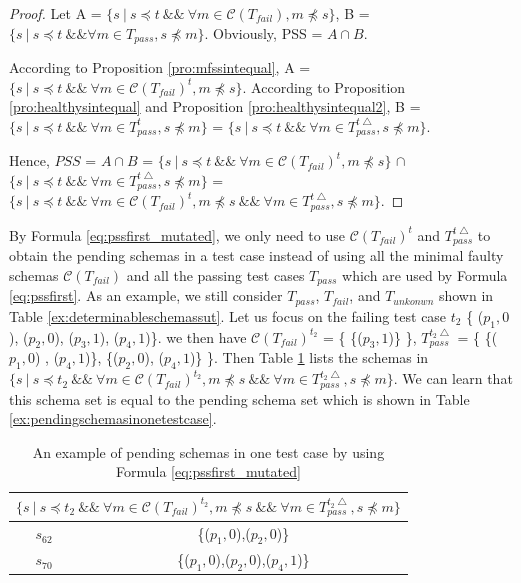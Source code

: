 \begin{proof}

Let A = $\{ s\ |\  s \preceq t\ \&\&\ \forall m \in \mathcal{C}(T_{fail}),  m \npreceq s \}$, B = $ \{ s\ |\ s \preceq t\ \&\&  \forall m \in T_{pass}, s \npreceq m \} $. Obviously, PSS = $A \cap B$.

According to Proposition \ref{pro:mfssintequal}, A = $\{ s\ |\  s \preceq t\ \&\&\ \forall m \in \mathcal{C}(T_{fail})^{t},  m \npreceq s \}$.
According to Proposition \ref{pro:healthysintequal} and Proposition \ref{pro:healthysintequal2}, B = $\{ s\ |\  s \preceq t\ \&\&\ \forall m \in T_{pass}^{t},  s \npreceq m \}$ = $\{ s\ |\  s \preceq t\ \&\&\ \forall m \in T_{pass}^{t\bigtriangleup},  s \npreceq m \}$.

Hence, $PSS$ = $A \cap B$ = $\{ s\ |\  s \preceq t\ \&\&\ \forall m \in \mathcal{C}(T_{fail})^{t},  m \npreceq s \}$ $\cap$ $\{ s\ |\  s \preceq t\ \&\&\ \forall m \in T_{pass}^{t\bigtriangleup},  s \npreceq m \}$ = $\{ s\ |\ s \preceq t\ \&\&\ \forall m \in \mathcal{C}(T_{fail})^{t},  m \npreceq s  \ \&\&\  \forall m \in T_{pass}^{t\bigtriangleup}, s \npreceq m \}$.
\end{proof}

By Formula \ref{eq:pssfirst_mutated}, we only need to use $\mathcal{C}(T_{fail})^{t}$ and $T_{pass}^{t\bigtriangleup}$ to obtain the pending schemas in a test case instead of using all the minimal faulty schemas $\mathcal{C}(T_{fail})$ and all the passing test cases $ T_{pass}$ which are used by Formula \ref{eq:pssfirst}. As an example, we still consider  $T_{pass}$, $T_{fail}$, and $T_{unkonwn}$ shown in Table \ref{ex:determinableschemassut}. Let us focus on the failing test case $t_{2}$ \{ ($p_{1}, 0$), ($p_{2}, 0$), ($p_{3}, 1$), ($p_{4}, 1$)\}. we then have  $\mathcal{C}(T_{fail})^{t_{2}}$ = \{ \{($p_{3}, 1$)\} \}, $T_{pass}^{t_{2}\bigtriangleup}$ = \{ \{($p_{1}, 0$) , ($p_{4}, 1$)\}, \{($p_{2}, 0$), ($p_{4}, 1$)\} \}. Then Table \ref{ex:pendingschemasinonetestcaseusingfaultyandhealthy} lists the schemas in $\{ s\ |\ s \preceq t_{2}\ \&\&\ \forall m \in \mathcal{C}(T_{fail})^{t_{2}},  m \npreceq s  \ \&\&\  \forall m \in T_{pass}^{t_{2}\bigtriangleup}, s \npreceq m \} $. We can learn that this schema set is equal to the pending schema set which is shown in Table \ref{ex:pendingschemasinonetestcase}.

\begin{table}[htbp]
  \centering
  \caption{An example of pending schemas in one test case by using Formula \ref{eq:pssfirst_mutated} }
  \label{ex:pendingschemasinonetestcaseusingfaultyandhealthy}
    \begin{tabular}{|c|c|} \hline
     \multicolumn{2}{|c|}{$\{ s\ |\ s \preceq t_{2}\ \&\&\ \forall m \in \mathcal{C}(T_{fail})^{t_{2}},  m \npreceq s  \ \&\&\  \forall m \in T_{pass}^{t_{2}\bigtriangleup}, s \npreceq m \} $} \\ \hline
   $s_{62}$ & \{($p_{1}, 0$),($p_{2}, 0$)\} \\
   $s_{ 70}$ & \{($p_{1}, 0$),($p_{2}, 0$),($p_{4}, 1$)\} \\ \hline
    \end{tabular}%
\end{table}



